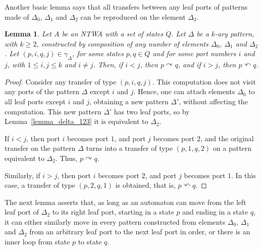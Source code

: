 \documentclass[12pt,a4paper]{article}
\newtheorem{lemma}{Lemma}
\theoremstyle{definition}
\begin{document}
Another basic lemma
says that all transfers between any leaf ports of patterns
made of $\Delta_0$, $\Delta_1$ and $\Delta_2$
can be reproduced on the element $\Delta_2$.

\begin{lemma}\label{lemma_from_big_elements_to_Delta_2}
Let $A$ be an NTWA with a set of states $Q$.
Let $\Delta$ be a $k$-ary pattern, with $k \geqslant 2$, 
constructed by composition of any number of elements $\Delta_0$, $\Delta_1$ and $\Delta_2$.
Let $(p,i,q,j) \in \gamma_\Delta$, for some states $p,q \in Q$ and
for some port numbers $i$ and $j$, with $1 \leqslant i,j \leqslant k$ and $i \neq j$.
Then, if $i < j$, then $p \curvearrowright q$,
and if $i > j$, then $p \curvearrowleft q$.
\end{lemma}
\begin{proof}
Consider any transfer of type $(p,i,q,j)$.
This computation does not visit any ports of the pattern $\Delta$ except $i$ and $j$.
Hence, one can attach elements $\Delta_0$
to all leaf ports except $i$ and $j$,
obtaining a new pattern $\Delta'$,
without affecting the computation.
This new pattern $\Delta'$ has two leaf ports,
so by Lemma~\ref{lemma_delta_123} it is equivalent to $\Delta_2$.

If $i < j$, then port $i$ becomes port $1$, and port $j$ becomes port $2$,
and the original transfer on the pattern $\Delta$
turns into a transfer of type $(p,1,q,2)$
on a pattern equivalent to $\Delta_2$.
Thus, $p \curvearrowright q$.

Similarly, if $i > j$, then port $i$ becomes port $2$, and port $j$ becomes port $1$.
In this case, a transfer of type $(p,2,q,1)$ is obtained, that is, $p \curvearrowleft q$.
\end{proof}

The next lemma asserts that,
as long as an automaton can move from the left leaf port of $\Delta_2$
to its right leaf port,
starting in a state $p$ and ending in a state $q$,
it can either similarly move
in every pattern constructed from elements $\Delta_0$, $\Delta_1$ and $\Delta_2$
from an arbitrary leaf port to the next leaf port in order,
or there is an inner loop from state $p$ to state $q$.
\end{document}
